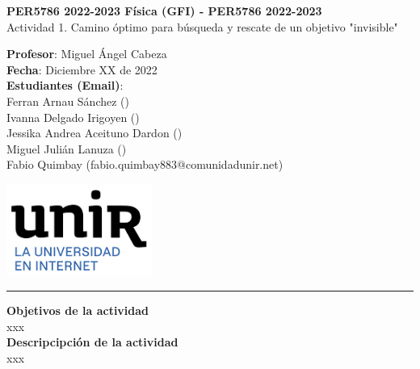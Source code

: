 \documentclass[11pt,letterpaper]{article}
\begin{document}
\pagestyle{plain}

\begin{center}\vspace{0cm}
\textbf{\large PER5786 2022-2023  Física (GFI) - PER5786 2022-2023}\\
Actividad 1. Camino óptimo para búsqueda y rescate de un objetivo "invisible"
\end{center}

\begin{flushleft}
	\textbf{Profesor}: Miguel Ángel Cabeza\\
	\textbf{Fecha}: Diciembre XX de 2022\\
	\textbf{Estudiantes (Email)}: \\
	\quad Ferran Arnau Sánchez ()\\
	\quad Ivanna Delgado Irigoyen ()\\
	\quad Jessika Andrea Aceituno Dardon ()\\
	\quad Miguel Julián Lanuza ()\\
	\quad Fabio Quimbay (fabio.quimbay883@comunidadunir.net)
\end{flushleft}

\begin{flushright}\vspace{-35mm}
\includegraphics[height=3cm]{logo.png}
\end{flushright}

\rule{\linewidth}{0.1mm}

\bigskip
\bigskip

\textbf{Objetivos de la actividad}\\

xxx\\

\textbf{Descripcipción de la actividad}\\

xxx

\end{document}
